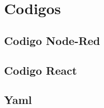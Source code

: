 \cleardoublepage
\addappheadtotoc
\appendixpage
\appendix
  \chapter{Codigos} \label{apenA}
    \section{Codigo Node-Red}
    \section{Codigo React}
    \section{Yaml}

	\clearpage

